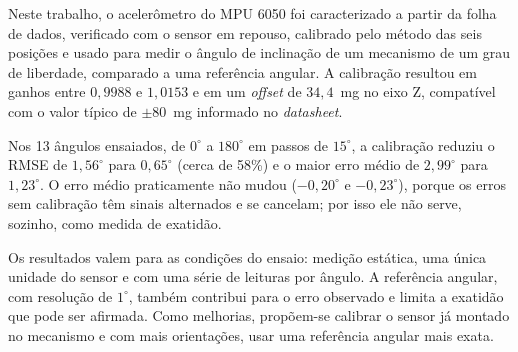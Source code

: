 \documentclass[conference]{IEEEtran}
\begin{document}
Neste trabalho, o acelerômetro do MPU 6050 foi caracterizado a partir da
folha de dados, verificado com o sensor em repouso, calibrado pelo método das
seis posições e usado para medir o ângulo de inclinação de um mecanismo de um
grau de liberdade, comparado a uma referência angular. A calibração resultou
em ganhos entre $0{,}9988$ e $1{,}0153$ e em um \textit{offset} de
$34{,}4$~mg no eixo Z, compatível com o valor típico de $\pm 80$~mg informado
no \textit{datasheet}.

Nos 13 ângulos ensaiados, de $0^\circ$ a $180^\circ$ em passos de $15^\circ$,
a calibração reduziu o RMSE de $1{,}56^\circ$ para $0{,}65^\circ$ (cerca de
58\%) e o maior erro médio de $2{,}99^\circ$ para $1{,}23^\circ$. O erro
médio praticamente não mudou ($-0{,}20^\circ$ e $-0{,}23^\circ$), porque os
erros sem calibração têm sinais alternados e se cancelam; por isso ele não
serve, sozinho, como medida de exatidão. 

Os resultados valem para as condições do ensaio: medição estática, uma única
unidade do sensor e com uma série de leituras por
ângulo. A referência angular, com resolução de $1^\circ$, também contribui
para o erro observado e limita a exatidão que pode ser afirmada. Como
melhorias, propõem-se calibrar o sensor já montado no mecanismo e com mais
orientações, usar uma referência angular mais exata.

\FloatBarrier %


\end{document}
